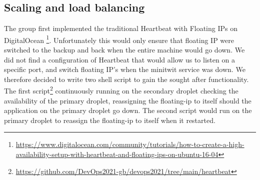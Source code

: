 \subsection{Scaling and load balancing}\label{subsection:scaling} %
The group first implemented the traditional Heartbeat with Floating IPs on DigitalOcean \footnote{\url{https://www.digitalocean.com/community/tutorials/how-to-create-a-high-availability-setup-with-heartbeat-and-floating-ips-on-ubuntu-16-04}}. Unfortunately this would only ensure that floating IP were switched to the backup and back when the entire machine would go down. We did not find a configuration of Heartbeat that would allow us to listen on a specific port, and switch floating IP's when the minitwit service was down. We therefore decided to write two shell script to gain the sought after functionality. The first script\footnote{\url{https://github.com/DevOps2021-gb/devops2021/tree/main/heartbeat}} continuously running on the secondary droplet checking the availability of the primary droplet, reassigning the floating-ip to itself should the application on the primary droplet go down. The second script would run on the primary droplet to reassign the floating-ip to itself when it restarted.